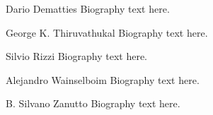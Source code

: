 \documentclass[10pt,journal,compsoc]{IEEEtran}
\begin{document}
\begin{IEEEbiography}{Dario Dematties}
Biography text here.
\end{IEEEbiography}

\begin{IEEEbiographynophoto}{George K. Thiruvathukal}
Biography text here.
\end{IEEEbiographynophoto}


\begin{IEEEbiographynophoto}{Silvio Rizzi}
Biography text here.
\end{IEEEbiographynophoto}

\begin{IEEEbiographynophoto}{Alejandro Wainselboim}
Biography text here.
\end{IEEEbiographynophoto}

\begin{IEEEbiographynophoto}{B. Silvano Zanutto}
Biography text here.
\end{IEEEbiographynophoto}






\end{document}
